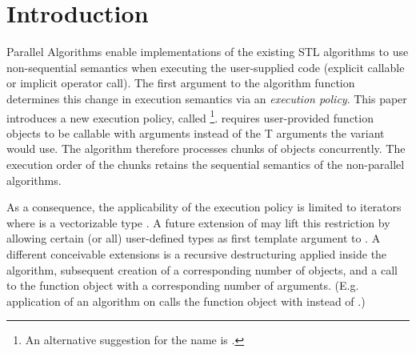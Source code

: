 \section{Introduction}

Parallel Algorithms enable implementations of the existing STL algorithms to use non-sequential semantics when executing the user-supplied code (explicit callable or implicit operator call).
The first argument to the algorithm function determines this change in execution semantics via an \emph{execution policy}.
This paper introduces a new execution policy, called \simdEP\footnote{
  An alternative suggestion for the name is .
}.
\simdEP requires user-provided function objects to be callable with \simd[<T, Abi>] arguments instead of the \type T arguments the \seqEP variant would use.
The algorithm therefore processes chunks of  objects concurrently.
The execution order of the chunks retains the sequential semantics of the non-parallel algorithms.

As a consequence, the applicability of the execution policy is limited to iterators where  is a vectorizable type \cite[{[parallel.simd.general]}]{N4744}.
A future extension of \simd may lift this restriction by allowing certain (or all) user-defined types as first template argument to \simd.
A different conceivable extensions is a recursive destructuring applied inside the algorithm, subsequent creation of a corresponding number of \simd objects, and a call to the function object with a corresponding number of arguments.
(E.g. application of an algorithm on  calls the function object with  instead of .)

